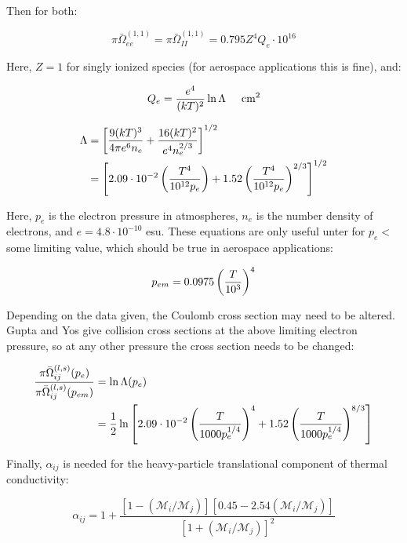\documentclass[10pt]{article}
\begin{document}
\begin{flushleft}
\begin{definition}
    Then for both:

    \begin{equation}
        \pi \bar{\Omega}_{ee}^{(1,1)} = \pi \bar{\Omega}_{II}^{(1,1)} = 0.795 Z^4 Q_e \cdot 10^{16}
    \end{equation}

    Here, $Z=1$ for singly ionized species (for aerospace applications this is fine), and:

    \begin{equation}
        Q_e = \frac{e^4}{(kT)^2} \ln \Lambda \hspace{5mm} \text{cm}^2
    \end{equation}

    \begin{align}
        \Lambda &= \left[ \frac{9 (kT)^3}{4 \pi e^6 n_e} + \frac{16 (kT)^2}{e^4 n_e^{2/3}} \right]^{1/2}
        \\ &= \left[ 2.09 \cdot 10^{-2} \left( \frac{T^4}{10^{12} p_e} \right) + 1.52 \left( \frac{T^4}{10^{12}p_e} \right)^{2/3} \right]^{1/2}
    \end{align}

    Here, $p_e$ is the electron pressure in atmospheres, $n_e$ is the number density of electrons, and $e = 4.8 \cdot 10^{-10}$  esu. These equations are only useful unter for $p_e < $ some limiting value, which should be true in aerospace applications:

    \begin{equation}
        p_{em} = 0.0975 \left( \frac{T}{10^3} \right)^4
    \end{equation}

    Depending on the data given, the Coulomb cross section may need to be altered. Gupta and Yos give collision cross sections at the above limiting electron pressure, so at any other pressure the cross section needs to be changed:

    \begin{align}
        \frac{\pi \bar{\Omega}_{ij}^{(l,s)}(p_e)}{\pi \bar{\Omega}_{ij}^{(l,s)}(p_{em})} &= \ln \Lambda (p_e)
        \\ &= \frac{1}{2} \ln \left[ 2.09 \cdot 10^{-2} \left( \frac{T}{1000 p_e^{1/4}} \right)^4 + 1.52 \left( \frac{T}{1000 p_e^{1/4}} \right)^{8/3} \right]
    \end{align}

    Finally, $\alpha_{ij}$ is needed for the heavy-particle translational component of thermal conductivity:

    \begin{equation}
        \alpha_{ij} = 1 + \frac{[1 - (\mathcal{M}_i / \mathcal{M}_j)][0.45 - 2.54(\mathcal{M}_i / \mathcal{M}_j)]}{[1 + (\mathcal{M}_i / \mathcal{M}_j)]^2}
    \end{equation}


\end{definition}
\end{flushleft}
\end{document}
